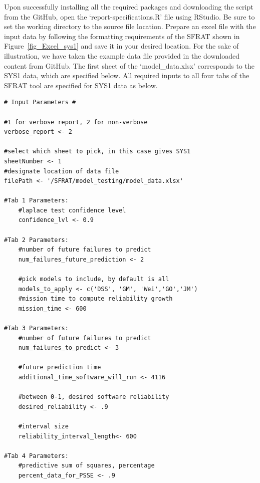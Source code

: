 \documentclass[conference]{IEEEtran}
\begin{document}
Upon successfully installing all the required packages and downloading the script from the GitHub, open the `report-specifications.R' file using RStudio. Be sure to set the working directory to the source file location. Prepare an excel file with the input data by following the formatting requirements of the SFRAT shown in Figure~\ref{fig_Excel_sys1} and save it in your desired location. For the sake of illustration, we have taken the example data file provided in the downloaded content from GitHub. The first sheet of the `model\_data.xlsx' corresponds to the SYS1 data, which are specified below. All required inputs to all four tabs of the SFRAT tool are specified for SYS1 data as below.
\begin{lstlisting}
# Input Parameters #

#1 for verbose report, 2 for non-verbose
verbose_report <- 2									

#select which sheet to pick, in this case gives SYS1
sheetNumber <- 1
#designate location of data file
filePath <- '/SFRAT/model_testing/model_data.xlsx'

#Tab 1 Parameters:
	#laplace test confidence level
	confidence_lvl <- 0.9

#Tab 2 Parameters:
	#number of future failures to predict
	num_failures_future_prediction <- 2	

	#pick models to include, by default is all
	models_to_apply <- c('DSS', 'GM', 'Wei','GO','JM')
	#mission time to compute reliability growth
	mission_time <- 600

#Tab 3 Parameters:
	#number of future failures to predict
	num_failures_to_predict <- 3

	#future prediction time
	additional_time_software_will_run <- 4116

	#between 0-1, desired software reliability
	desired_reliability <- .9

	#interval size
	reliability_interval_length<- 600

#Tab 4 Parameters:
	#predictive sum of squares, percentage
	percent_data_for_PSSE <- .9
	
\end{lstlisting}

\end{document}
